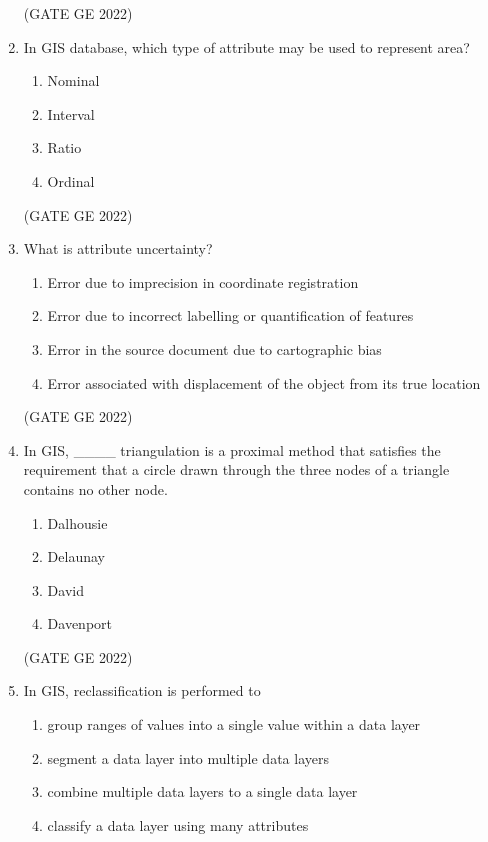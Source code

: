 \documentclass[journal,12pt,onecolumn]{IEEEtran}
\theoremstyle{remark}
\begin{document}
\begin{enumerate}
\hfill (GATE GE 2022)

\item In GIS database, which type of attribute may be used to represent area?
\begin{enumerate}
    \item Nominal
    \item Interval
    \item Ratio
    \item Ordinal
\end{enumerate}

\hfill (GATE GE 2022)

\item What is attribute uncertainty?
\begin{enumerate}
    \item Error due to imprecision in coordinate registration
    \item Error due to incorrect labelling or quantification of features
    \item Error in the source document due to cartographic bias
    \item Error associated with displacement of the object from its true location
\end{enumerate}

\hfill (GATE GE 2022)

\item In GIS, \_\_\_\_ triangulation is a proximal method that satisfies the requirement that a circle drawn through the three nodes of a triangle contains no other node.
\begin{enumerate}
    \item Dalhousie
    \item Delaunay
    \item David
    \item Davenport
\end{enumerate}

\hfill (GATE GE 2022)

\item In GIS, reclassification is performed to
\begin{enumerate}
    \item group ranges of values into a single value within a data layer
    \item segment a data layer into multiple data layers
    \item combine multiple data layers to a single data layer
    \item classify a data layer using many attributes
\end{enumerate}


\end{enumerate}
\end{document}

